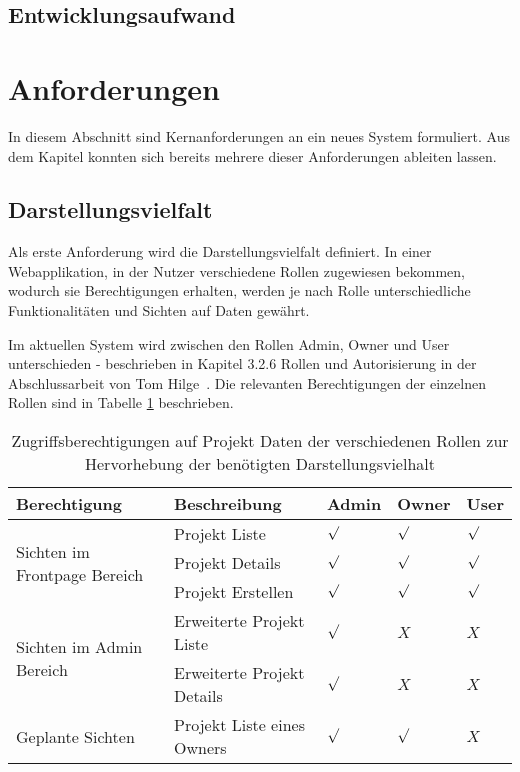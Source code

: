 \subsection{Entwicklungsaufwand}

\section{Anforderungen}
\label{sec:requirements:req}
In diesem Abschnitt sind Kernanforderungen an ein neues System formuliert.
Aus dem Kapitel  konnten sich bereits mehrere dieser Anforderungen ableiten lassen.

\subsection{Darstellungsvielfalt}
\label{sec:requirements:req:view}
Als erste Anforderung wird die Darstellungsvielfalt definiert.
In einer Webapplikation, in der Nutzer verschiedene Rollen zugewiesen bekommen, wodurch sie Berechtigungen erhalten,
werden je nach Rolle unterschiedliche Funktionalitäten und Sichten auf Daten gewährt.

Im aktuellen System wird zwischen den Rollen Admin, Owner und User unterschieden - beschrieben in Kapitel 3.2.6 Rollen und Autorisierung
in der Abschlussarbeit von Tom Hilge~\cite{Abschlussarbeit-Tom-Hilge}.
Die relevanten Berechtigungen der einzelnen Rollen sind in Tabelle \ref{tbl:req:roles} beschrieben.

\begin{table}[h!]
    \begin{tabular}{|p{}|p{}|p{}|p{}|p{}|}
        \hline
        \textbf{Berechtigung} & \textbf{Beschreibung} & \textbf{Admin} & \textbf{Owner} & \textbf{User} \\ \hline
        \multirow{3}{*}{Sichten im Frontpage Bereich}
        & Projekt Liste & $\surd$ & $\surd$ & $\surd$\\
        & Projekt Details & $\surd$ & $\surd$ & $\surd$\\
        & Projekt Erstellen & $\surd$ & $\surd$ & $\surd$ \\
        \hline
        \multirow{2}{*}{Sichten im Admin Bereich}
        & Erweiterte Projekt Liste & $\surd$ & $X$ & $X$\\
        & Erweiterte Projekt Details & $\surd$ & $X$ & $X$\\
        \hline
        \multirow{1}{*}{Geplante Sichten}
        & Projekt Liste eines Owners & $\surd$ & $\surd$ & $X$\\
        \hline
    \end{tabular}
    \vspace{5pt}
    \caption{Zugriffsberechtigungen auf Projekt Daten der verschiedenen Rollen zur Hervorhebung der benötigten Darstellungsvielhalt}
    \label{tbl:req:roles}
\end{table}

